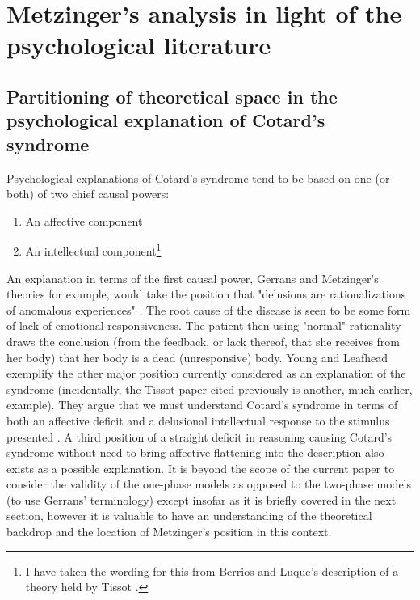 \chapter{Metzinger's analysis in light of the psychological literature}
\label{chap:psych_lit}

\section{Partitioning of theoretical space in the psychological explanation of Cotard's syndrome}
\label{psych_partitioning}

Psychological explanations of Cotard's syndrome tend to be based on one (or both) of two chief causal powers:
\begin{enumerate}
\item An affective component
\item An intellectual component\footnote{I have taken the wording for this from Berrios and Luque's \cite{berrios1995b} description of a theory held by Tissot \cite{tissot1921delire}.}
\end{enumerate}

An explanation in terms of the first causal power, Gerrans \cite{gerrans2003} and Metzinger's \cite{metzinger2003} theories for example, would take the position that "delusions are rationalizations of anomalous experiences" \cite[p. 47]{gerrans2003}. The root cause of the disease is seen to be some form of lack of emotional responsiveness. The patient then using "normal" rationality draws the conclusion (from the feedback, or lack thereof, that she receives from her body) that her body is a dead (unresponsive) body. Young and Leafhead exemplify the other major position currently considered as an explanation of the syndrome (incidentally, the Tissot paper cited previously is another, much earlier, example). They argue that we must understand Cotard's syndrome in terms of both an affective deficit and a delusional intellectual response to the stimulus presented \cite[pp. 164-165]{young1995}. A third position of a straight deficit in reasoning causing Cotard's syndrome without need to bring affective flattening into the description also exists as a possible explanation. It is beyond the scope of the current paper to consider the validity of the one-phase models as opposed to the two-phase models (to use Gerrans' terminology) except insofar as it is briefly covered in the next section, however it is valuable to have an understanding of the theoretical backdrop and the location of Metzinger's position in this context.

